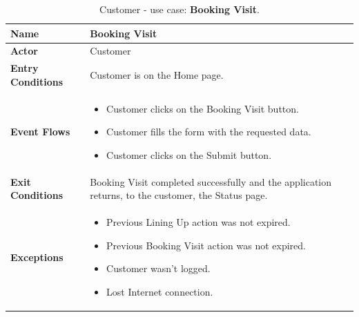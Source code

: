 \begin{table}[H]
    \centering
    \begin{tabular}{| m{} | m{} |}
        \hline
        \textbf{Name}            & Booking Visit                                                                                       \\
        \hline
        \textbf{Actor}            & Customer                                                                                            \\
        \hline
        \textbf{Entry Conditions} & Customer is on the Home page.                                                                       \\
        \hline
        \textbf{Event Flows} &
        \begin{itemize}
            \item Customer clicks on the Booking Visit button.
            \item Customer fills the form with the requested data.
            \item Customer clicks on the Submit button.
        \end{itemize} \\
        \hline
        \textbf{Exit Conditions}  & Booking Visit completed successfully and the application returns, to the customer, the Status page. \\
        \hline
        \textbf{Exceptions} &
        \begin{itemize}
            \item Previous Lining Up action was not expired.
            \item Previous Booking Visit action was not expired.
            \item Customer wasn't logged.
            \item Lost Internet connection.
        \end{itemize} \\
        \hline
    \end{tabular}
    \caption{Customer - use case: \textbf{Booking Visit}.}
    \label{tableBookingVisit}
\end{table}

